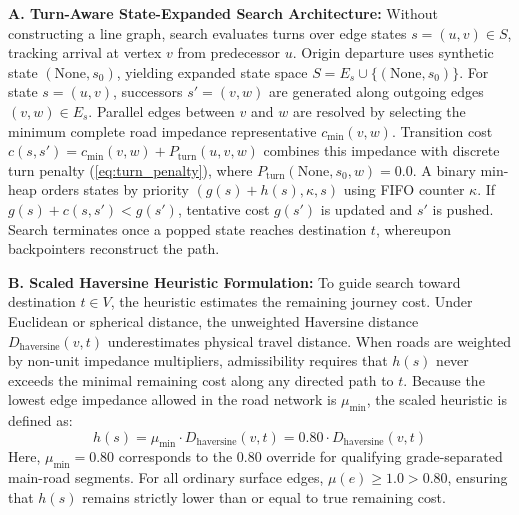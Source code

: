 \documentclass[conference]{IEEEtran}
\begin{document}
\noindent\textbf{A. Turn-Aware State-Expanded Search Architecture:} Without constructing a line graph, search evaluates turns over edge states $s=(u,v) \in S$, tracking arrival at vertex $v$ from predecessor $u$. Origin departure uses synthetic state $(\text{None}, s_0)$, yielding expanded state space $S=E_s \cup \{(\text{None}, s_0)\}$. For state $s=(u,v)$, successors $s'=(v,w)$ are generated along outgoing edges $(v,w) \in E_s$. Parallel edges between $v$ and $w$ are resolved by selecting the minimum complete road impedance representative $c_{\min}(v,w)$. Transition cost $c(s,s') = c_{\min}(v,w) + P_{\text{turn}}(u,v,w)$ combines this impedance with discrete turn penalty (\ref{eq:turn_penalty}), where $P_{\text{turn}}(\text{None}, s_0, w) = 0.0$. A binary min-heap orders states by priority $(g(s)+h(s), \kappa, s)$ using FIFO counter $\kappa$. If $g(s)+c(s,s') < g(s')$, tentative cost $g(s')$ is updated and $s'$ is pushed. Search terminates once a popped state reaches destination $t$, whereupon backpointers reconstruct the path.

\noindent\textbf{B. Scaled Haversine Heuristic Formulation:} To guide search toward destination $t \in V$, the heuristic estimates the remaining journey cost. Under Euclidean or spherical distance, the unweighted Haversine distance $D_{\text{haversine}}(v, t)$ underestimates physical travel distance. When roads are weighted by non-unit impedance multipliers, admissibility requires that $h(s)$ never exceeds the minimal remaining cost along any directed path to $t$. Because the lowest edge impedance allowed in the road network is $\mu_{\min}$, the scaled heuristic is defined as:
\begin{equation}
\label{eq:scaled_heuristic}
h(s) = \mu_{\min} \cdot D_{\text{haversine}}(v, t) = 0.80 \cdot D_{\text{haversine}}(v, t)
\end{equation}
Here, $\mu_{\min} = 0.80$ corresponds to the 0.80 override for qualifying grade-separated main-road segments. For all ordinary surface edges, $\mu(e) \ge 1.0 > 0.80$, ensuring that $h(s)$ remains strictly lower than or equal to true remaining cost.
\end{document}
